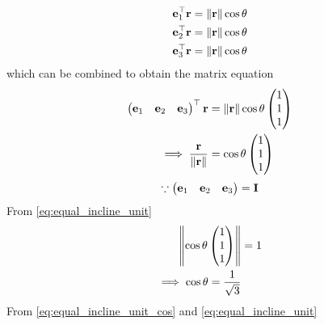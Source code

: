 \documentclass[journal,12pt,twocolumn]{IEEEtran}
\renewcommand\thesection{\arabic{section}}
\begin{document}
\begin{enumerate}[label=\thesection.\arabic*.,ref=\thesection.\theenumi]
  \begin{align}
	  {\mathbf{e}_1^{\top} \mathbf{r}} = \left\lVert\mathbf{r}\right\rVert\cos \theta
	  \\
	  {\mathbf{e}_2^{\top} \mathbf{r}} = \left\lVert\mathbf{r}\right\rVert\cos \theta
	  \\
	  {\mathbf{e}_3^{\top} \mathbf{r}} = \left\lVert\mathbf{r}\right\rVert\cos \theta
  \end{align}
  which can be combined to obtain the matrix equation
  \begin{align}
	  \begin{pmatrix}\mathbf{e}_1 & \mathbf{e}_2 & \mathbf{e}_3\end{pmatrix}^{\top}\mathbf{r} &= \left\lVert\mathbf{r}\right\rVert\cos \theta \begin{pmatrix}1\\1\\1\end{pmatrix}
	  \\
	  \implies \frac{\mathbf{r}}{\left\lVert\mathbf{r}\right\rVert}&= \cos \theta \begin{pmatrix}1\\1\\1\end{pmatrix}
	  \label{eq:equal_incline_unit}
  \end{align}
  \begin{align}
	  \because 	\begin{pmatrix}\mathbf{e}_1 & \mathbf{e}_2 & \mathbf{e}_3\end{pmatrix} = \mathbf{I}
  \end{align}
  From 
	  \eqref{eq:equal_incline_unit}
  \begin{align}
	  \left\lVert\cos \theta \begin{pmatrix}1\\1\\1\end{pmatrix}\right\rVert &= 1
	  \\
	  \implies\cos \theta  = \frac{1}{\sqrt{3}}
	  \label{eq:equal_incline_unit_cos}
  \end{align}
 From  
	  \eqref{eq:equal_incline_unit_cos} and 
	  \eqref{eq:equal_incline_unit}


\end{enumerate}
\end{document}
